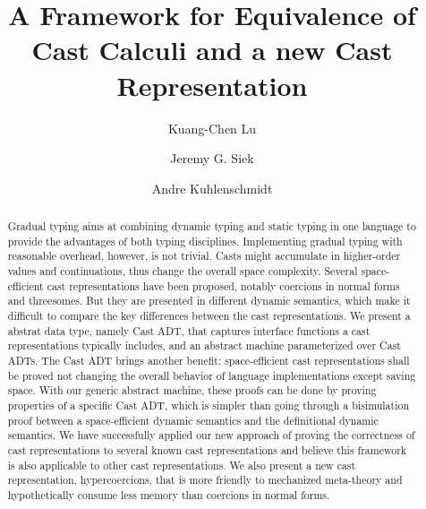 \documentclass[runningheads]{llncs}
\begin{document}
%
\title{A Framework for Equivalence of Cast Calculi and a new Cast Representation}
%
%
\author{Kuang-Chen Lu \and
Jeremy G. Siek \and
Andre Kuhlenschmidt
}
%
%
%
\maketitle              %
%
\begin{abstract}
Gradual typing aims at combining dynamic typing and static typing in one 
language to provide the advantages of both typing disciplines. Implementing 
gradual typing with reasonable overhead, however, is not trivial. Casts might 
accumulate in higher-order values and continuations, thus change the overall 
space complexity. Several space-efficient cast representations have been 
proposed, notably coercions in normal forms and threesomes. But they are
presented in different dynamic semantics, which make it difficult to compare
the key differences between the cast representations. We present a abstrat
data type, namely Cast ADT, that captures interface functions a cast representations
typically includes, and an abstract machine parameterized over Cast ADTs.
The Cast ADT brings another benefit: space-efficient cast representations 
shall be proved not changing the 
overall behavior of language implementations except saving space.
With our generic abstract machine, these proofs can be done by proving properties
of a specific Cast ADT, which is simpler than going through a bisimulation proof 
between a space-efficient dynamic semantics and the definitional dynamic semantics.
We have successfully applied our new approach of proving the correctness of cast 
representations to several known cast representations and believe this framework
is also applicable to other cast representations.
We also present a new cast representation, hypercoercions, that is more friendly
to mechanized meta-theory and hypothetically consume less memory than coercions
in normal forms.


\end{abstract}
%
%
%
\end{document}
